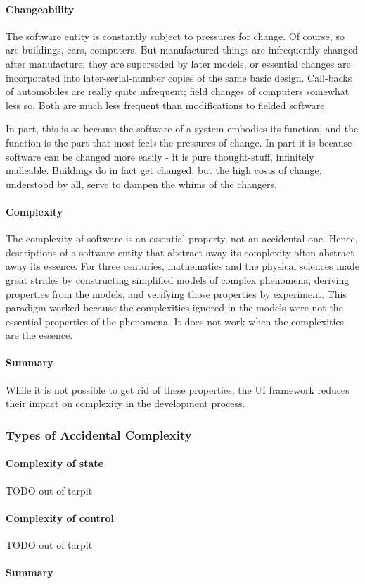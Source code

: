 \paragraph{Changeability}
The software entity is constantly subject to pressures for change. Of course, so are buildings, cars, computers. But manufactured things are infrequently changed after manufacture; they are superseded by later models, or essential changes are incorporated into later-serial-number copies of the same basic design. Call-backs of automobiles are really quite infrequent; field changes of computers somewhat less so. Both are much less frequent than modifications to fielded software.

In part, this is so because the software of a system embodies its function, and the function is the part that most feels the pressures of change. In part it is because software can be changed more easily - it is pure thought-stuff, infinitely malleable. Buildings do in fact get changed, but the high costs of change, understood by all, serve to dampen the whims of the changers. \citep{nosilverbullet}

\paragraph{Complexity}
The complexity of software is an essential property, not an accidental one. Hence, descriptions of a software entity that abstract away its complexity often abstract away its essence. For three centuries, mathematics and the physical sciences made great strides by constructing simplified models of complex phenomena, deriving properties from the models, and verifying those properties by experiment. This paradigm worked because the complexities ignored in the models were not the essential properties of the phenomena. It does not work when the complexities are the essence. \citep{nosilverbullet} \\

\paragraph{Summary}
While it is not possible to get rid of these properties, the UI framework reduces their impact on complexity in the development process.


\subsubsection{Types of Accidental Complexity}
\paragraph{Complexity of state}
TODO out of tarpit
\paragraph{Complexity of control}
TODO out of tarpit
\paragraph{Summary}
